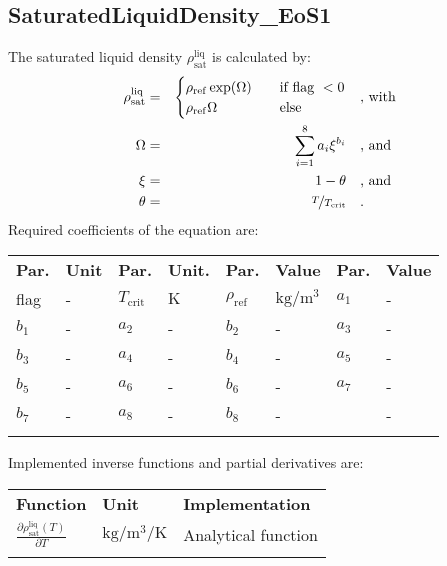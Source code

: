 \subsection{SaturatedLiquidDensity\_EoS1}
\label{cha:approaches:refd:eos1}
%
The saturated liquid density $\rho_\mathrm{sat}^{\mathrm{liq}}$ is calculated by:
%
\begin{equation*}
	\begin{split}
		\rho_\mathrm{sat}^\mathrm{liq} &=& \begin{cases} \rho_\mathrm{ref} \exp(\Omega) & \quad \text{if flag } < 0 \\ \rho_\mathrm{ref} \Omega & \quad \text{else} \end{cases} & \quad\text{, with} \\
		\Omega &=& \sum_{i=1}^{8} a_i \xi^{b_i} & \quad\text{, and} \\
		\xi &=& 1 - \theta & \quad\text{, and} \\
		\theta &=& \nicefrac{T}{T_\mathrm{crit}} & \quad\text{.}
	\end{split}
\end{equation*}
%
Required coefficients of the equation are:
%
\begin{longtable}[l]{ll|ll|ll|ll}
\toprule
\addlinespace
\textbf{Par.} & \textbf{Unit} & \textbf{Par.} &	\textbf{Unit.} & \textbf{Par.} & \textbf{Value} & \textbf{Par.} & \textbf{Value} \\
\addlinespace
\midrule
\endhead

\bottomrule
\endfoot
\bottomrule
\endlastfoot
\addlinespace

flag & - & $T_\mathrm{crit}$ & $\si{\kelvin}$ & $\rho_\mathrm{ref}$ & $\si{\kilogram\per\cubic\meter}$ & $a_1$ & - \\	
$b_1$ & - &	$a_2$ & - &	$b_2$ & - &	$a_3$ & - \\	
$b_3$ & - &	$a_4$ & - &	$b_4$ & - &	$a_5$ & - \\	
$b_5$ & - &	$a_6$ & - &	$b_6$ & - &	$a_7$ & - \\	
$b_7$ & - &	$a_8$ & - &	$b_8$ & - &	 & - \\


\addlinespace
\end{longtable}
%
Implemented inverse functions and partial derivatives are:

%
\begin{longtable}[l]{l|l|l}
	\toprule
	\addlinespace
	\textbf{Function} & \textbf{Unit} &	\textbf{Implementation} \\
	\addlinespace
	\midrule
	\endhead
	
	\bottomrule
	\endfoot
	\bottomrule
	\endlastfoot
	\addlinespace
	
	$\frac{\partial \rho_\mathrm{sat}^\mathrm{liq}(T)}{\partial T}$	& $\si{\kilogram\per\cubic\meter\per\kelvin}$ & Analytical function\\
	
	\addlinespace
\end{longtable}
%
